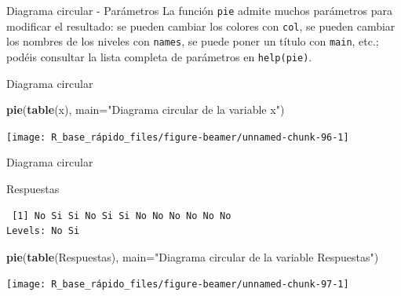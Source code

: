\documentclass[
  ignorenonframetext,
  aspectratio=169]{beamer}
\newenvironment{Shaded}{\begin{snugshade}}{\end{snugshade}}
\newcommand{\AttributeTok}[1]{\textcolor[rgb]{0.13,0.29,0.53}{#1}}
\newcommand{\FunctionTok}[1]{\textcolor[rgb]{0.13,0.29,0.53}{\textbf{#1}}}
\newcommand{\NormalTok}[1]{#1}
\newcommand{\StringTok}[1]{\textcolor[rgb]{0.31,0.60,0.02}{#1}}
\begin{document}
\begin{frame}[fragile]{Diagrama circular - Parámetros}
\label{diagrama-circular---paruxe1metros}
La función \texttt{pie} admite muchos parámetros para modificar el
resultado: se pueden cambiar los colores con \texttt{col}, se pueden
cambiar los nombres de los niveles con \texttt{names}, se puede poner un
título con \texttt{main}, etc.; podéis consultar la lista completa de
parámetros en \texttt{help(pie)}.
\end{frame}

\begin{frame}[fragile]{Diagrama circular}
\label{diagrama-circular-1}
\begin{Shaded}
\begin{Highlighting}[]
\FunctionTok{pie}\NormalTok{(}\FunctionTok{table}\NormalTok{(x), }\AttributeTok{main=}\StringTok{"Diagrama circular de la variable x"}\NormalTok{)}
\end{Highlighting}
\end{Shaded}

\begin{center}\texttt{[image: R\_base\_rápido\_files/figure-beamer/unnamed-chunk-96-1]} \end{center}
\end{frame}

\begin{frame}[fragile]{Diagrama circular}
\label{diagrama-circular-2}
\begin{Shaded}
\begin{Highlighting}[]
\NormalTok{Respuestas}
\end{Highlighting}
\end{Shaded}

\begin{verbatim}
 [1] No Si Si No Si Si No No No No No No
Levels: No Si
\end{verbatim}

\begin{Shaded}
\begin{Highlighting}[]
\FunctionTok{pie}\NormalTok{(}\FunctionTok{table}\NormalTok{(Respuestas), }\AttributeTok{main=}\StringTok{"Diagrama circular de la variable Respuestas"}\NormalTok{)}
\end{Highlighting}
\end{Shaded}

\begin{center}\texttt{[image: R\_base\_rápido\_files/figure-beamer/unnamed-chunk-97-1]} \end{center}
\end{frame}
\end{document}
